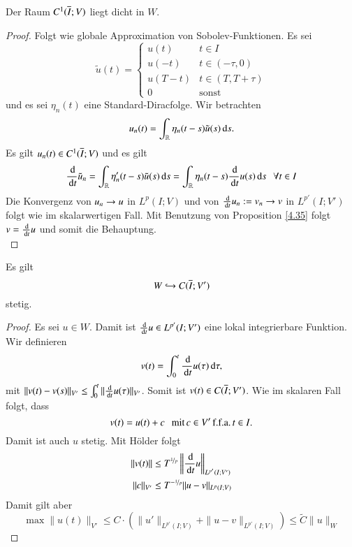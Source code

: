 \begin{prop}\label{4.36}
    Der Raum $C^1(\overline I; V)$ liegt dicht in $W$.
\end{prop}

\begin{proof}
    Folgt wie globale Approximation von Sobolev-Funktionen. Es sei 
    \[
        \tilde u(t)=\begin{cases} u(t) & t\in I \\ u(-t) & t\in(-\tau,0) \\ u(T-t) & t\in (T,T+\tau) \\
        0 & \text{sonst} \end{cases}
    \]
    und es sei $\eta_n(t)$ eine Standard-Diracfolge. Wir betrachten
    \[
        u_n(t)=\int_\mathbb{R} \eta_n(t-s) \tilde u(s) \, \mathrm{d} s.
    \]
    Es gilt $u_n(t)\in C^1(\overline I;V)$ und es gilt
    \[
        \frac{\, \mathrm{d}}{\, \mathrm{d} t} \tilde u_n = \int_\mathbb{R} \eta'_n(t-s) \tilde u(s) \, \mathrm{d} s
        =\int_\mathbb{R} \eta_n(t-s) \frac{\, \mathrm{d}}{\, \mathrm{d} t} u(s) \, \mathrm{d} s \hspace{.25cm} \forall t\in I
    \]
    Die Konvergenz von $u_n\rightarrow u$ in $L^p(I;V)$ und von $\frac{\, \mathrm{d}}{\, \mathrm{d} t}u_n:=v_n\rightarrow v$ in $L^{p'}(I;V')$
    folgt wie im skalarwertigen Fall. Mit Benutzung von Proposition \ref{4.35} folgt $v=\frac{\, \mathrm{d}}{\, \mathrm{d} t}u$
    und somit die Behauptung. \[ \]
\end{proof}

\begin{prop}\label{4.37}
    Es gilt
    \[
        W\hookrightarrow C(\overline I;V') 
    \]
    stetig.
\end{prop}

\begin{proof}
    Es sei $u\in W$. Damit ist $\frac{\, \mathrm{d}}{\, \mathrm{d} t}u \in L^{p'}(I;V')$ eine lokal integrierbare Funktion.
    Wir definieren
    \[
        v(t)=\int_0^t\frac{\, \mathrm{d}}{\, \mathrm{d} t} u(\tau)\, \mathrm{d} \tau,
    \]
    mit $\|v(t)-v(s)\|_{V'}\leq \int_0^t \|\frac{\, \mathrm{d}}{\, \mathrm{d} t} u(\tau)\|_{V'}$.
    Somit ist $v(t)\in C(\overline I; V')$. Wie im skalaren Fall folgt, dass
    \[
        v(t)=u(t)+c \hspace{.25cm} \text{mit} \, c\in V' \, \text{f.f.a.} \, t\in I.
    \]
    Damit ist auch $u$ stetig. Mit Hölder folgt
    \begin{align*}
        \|v(t)\|&\leq T^{\nicefrac1p}\left\|\frac{\, \mathrm{d}}{\, \mathrm{d} t}u\right\|_{L^{p'}(I;V')} \\
        \|c\|_{V'}&\leq T^{-\nicefrac{1}{p}}\|u-v\|_{L^p(I;V)}
    \end{align*}
    Damit gilt aber
    \[
        \max \|u(t)\|_{V'}\leq C\cdot \left( \|u'\|_{L^{p'}(I;V)} + \|u-v\|_{L^{p'}(I;V)}\right)
        \leq \tilde C \|u\|_W
    \]
\end{proof}

